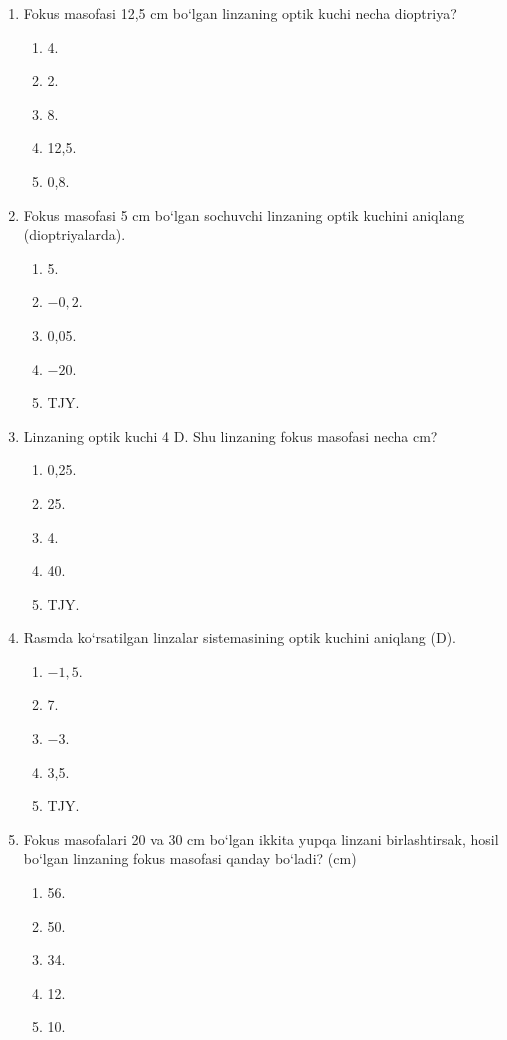 \begin{enumerate}
\item Fokus masofasi 12,5 cm bo‘lgan linzaning optik kuchi necha dioptriya?
\begin{enumerate}[label=\Alph*)]
\item 4.
\item 2.
\item 8.
\item 12,5.
\item 0,8.
\end{enumerate}

\item Fokus masofasi 5 cm bo‘lgan sochuvchi linzaning optik kuchini aniqlang (dioptriyalarda).
\begin{enumerate}[label=\Alph*)]
\item 5.
\item $-0{,}2$.
\item 0,05.
\item $-20$.
\item TJY.
\end{enumerate}

\item Linzaning optik kuchi 4 D. Shu linzaning fokus masofasi necha cm?
\begin{enumerate}[label=\Alph*)]
\item 0,25.
\item 25.
\item 4.
\item 40.
\item TJY.
\end{enumerate}

\item Rasmda ko‘rsatilgan linzalar sistemasining optik kuchini aniqlang (D).
\begin{enumerate}[label=\Alph*)]
\item $-1{,}5$.
\item 7.
\item $-3$.
\item 3,5.
\item TJY.
\end{enumerate}

\item Fokus masofalari 20 va 30 cm bo‘lgan ikkita yupqa linzani birlashtirsak, hosil bo‘lgan linzaning fokus masofasi qanday bo‘ladi? (cm)
\begin{enumerate}[label=\Alph*)]
\item 56.
\item 50.
\item 34.
\item 12.
\item 10.
\end{enumerate}






\end{enumerate}
